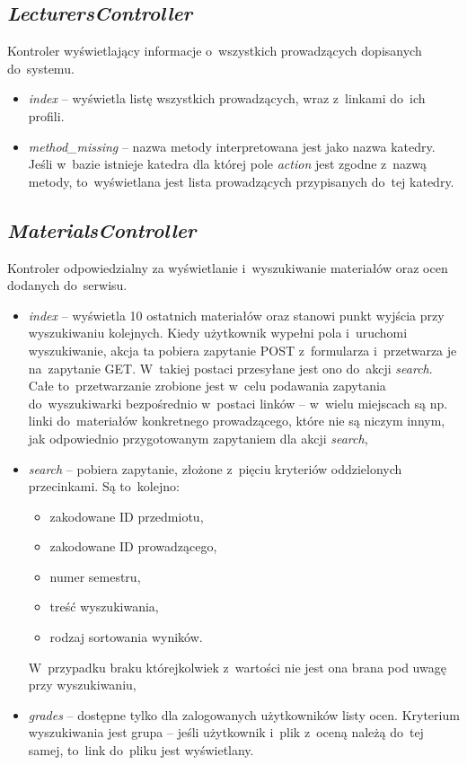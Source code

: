 \documentclass[a4paper,12pt,oneside]{report}
\begin{document}
\subsection{\emph{LecturersController}}
\label{con:lecturers}
  Kontroler wyświetlający informacje o~wszystkich prowadzących dopisanych do~systemu.
\begin{itemize}
  \item \emph{index} -- wyświetla listę wszystkich prowadzących, wraz z~linkami do~ich profili.
  \item \emph{method\_missing} -- nazwa metody interpretowana jest jako nazwa katedry. Jeśli w~bazie istnieje katedra dla której pole \emph{action} jest zgodne z~nazwą metody, to~wyświetlana jest lista prowadzących przypisanych do~tej katedry.
\end{itemize}

\subsection{\emph{MaterialsController}}
\label{con:materials}
  Kontroler odpowiedzialny za wyświetlanie i~wyszukiwanie materiałów oraz ocen dodanych do~serwisu.
\begin{itemize}
  \item \emph{index} -- wyświetla 10 ostatnich materiałów oraz stanowi punkt wyjścia przy wyszukiwaniu kolejnych. Kiedy użytkownik wypełni pola i~uruchomi wyszukiwanie, akcja ta pobiera zapytanie POST z~formularza i~przetwarza je na~zapytanie GET. W~takiej postaci przesyłane jest ono do~akcji \emph{search}. Całe to~przetwarzanie zrobione jest w~celu podawania zapytania do~wyszukiwarki bezpośrednio w~postaci linków -- w~wielu miejscach są np. linki do~materiałów konkretnego prowadzącego, które nie są niczym innym, jak odpowiednio przygotowanym zapytaniem dla akcji \emph{search},
  \item \emph{search} -- pobiera zapytanie, złożone z~pięciu kryteriów oddzielonych przecinkami. Są to~kolejno:
  \begin{itemize}
    \item zakodowane ID przedmiotu,
    \item zakodowane ID prowadzącego,
    \item numer semestru,
    \item treść wyszukiwania,
    \item rodzaj sortowania wyników.
  \end{itemize}
  W~przypadku braku którejkolwiek z~wartości nie jest ona brana pod uwagę przy wyszukiwaniu,
  \item \emph{grades} -- dostępne tylko dla zalogowanych użytkowników listy ocen. Kryterium wyszukiwania jest grupa -- jeśli użytkownik i~plik z~oceną należą do~tej samej, to~link do~pliku jest wyświetlany.
\end{itemize}
\end{document}
